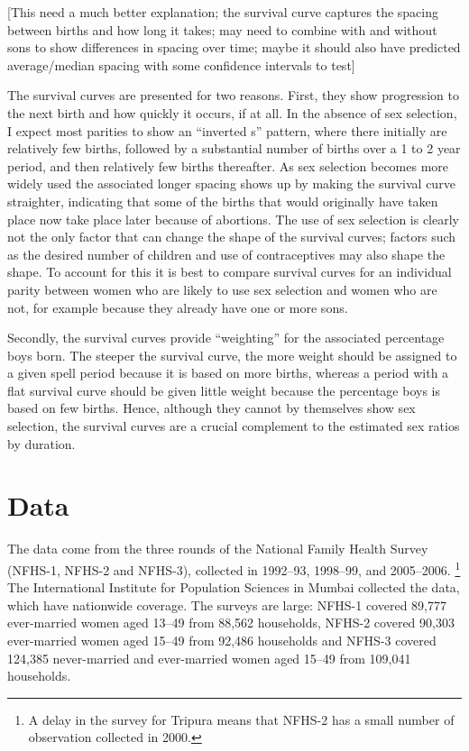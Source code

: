 \documentclass[12pt,letterpaper]{article}
\begin{document}
[This need a much better explanation; the survival curve captures the spacing
between births and how long it takes; may need to combine with and without
sons to show differences in spacing over time; maybe it should also have
predicted average/median spacing with some confidence intervals to test]


The survival curves are presented for two reasons.
First, they show progression to the next birth and how quickly 
it occurs, if at all.
In the absence of sex selection, I expect most parities to show an 
``inverted s'' pattern, where there initially are relatively few births, 
followed by a substantial number of births over a 1 to 2 year period, and then
relatively few births thereafter.
As sex selection becomes more widely used the associated
longer spacing shows up by making the survival curve straighter,
indicating that some of the births that would originally have taken place
now take place later because of abortions.
The use of sex selection is clearly not the only factor that can change the shape of
the survival curves; factors such as the desired number of children and
use of contraceptives may also shape the shape.
To account for this it is best to compare survival curves for an individual
parity between women who are likely to use sex selection and women who are
not, for example because they already have one or more sons.

Secondly, the survival curves provide ``weighting'' for the associated percentage 
boys born.
The steeper the survival curve, the more weight should be assigned to a given
spell period because it is based on more births, 
whereas a period with a flat survival curve should be given little weight because the 
percentage boys is based on few births.
Hence, although they cannot by themselves show sex selection, the survival
curves are a crucial complement to the estimated sex ratios by duration.


\section{Data\label{sec:data}}

The data come from the three rounds of the National Family Health Survey 
(NFHS-1, NFHS-2 and NFHS-3),
collected in 1992--93, 1998--99, and 2005--2006.%
\footnote{
A delay in the survey for Tripura means that NFHS-2 has a small number of observation 
collected in 2000.
}
The International Institute for Population Sciences in Mumbai collected the data,
which have nationwide coverage.
The surveys are large: NFHS-1 covered 89,777 ever-married women 
aged 13--49 from 88,562 households,
NFHS-2 covered 90,303 ever-married women aged 15--49 from 92,486 households
and NFHS-3 covered 124,385 never-married and ever-married women aged 
15--49 from 109,041 households.
\end{document}
